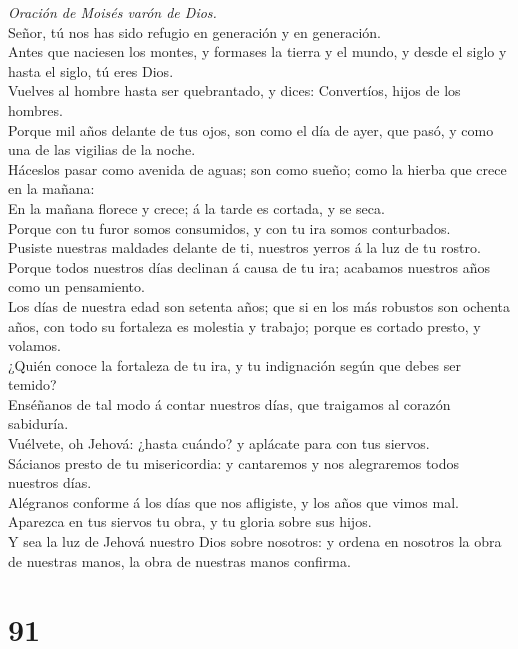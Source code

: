 \emph{Oración de Moisés varón de Dios.}\\
Señor, tú nos has sido refugio en generación y en generación.\\
 Antes que naciesen los montes, y formases la tierra y el
mundo, y desde el siglo y hasta el siglo, tú eres Dios.\\
 Vuelves al hombre hasta ser quebrantado, y dices:
Convertíos, hijos de los hombres.\\
 Porque mil años delante de tus ojos, son como el día de
ayer, que pasó, y como una de las vigilias de la noche.\\
 Háceslos pasar como avenida de aguas; son como sueño; como
la hierba que crece en la mañana:\\
 En la mañana florece y crece; á la tarde es cortada, y se
seca.\\
 Porque con tu furor somos consumidos, y con tu ira somos
conturbados.\\
 Pusiste nuestras maldades delante de ti, nuestros yerros á
la luz de tu rostro.\\
 Porque todos nuestros días declinan á causa de tu ira;
acabamos nuestros años como un pensamiento.\\
 Los días de nuestra edad son setenta años; que si en los
más robustos son ochenta años, con todo su fortaleza es molestia y
trabajo; porque es cortado presto, y volamos.\\
 ¿Quién conoce la fortaleza de tu ira, y tu indignación
según que debes ser temido?\\
 Enséñanos de tal modo á contar nuestros días, que
traigamos al corazón sabiduría.\\
 Vuélvete, oh Jehová: ¿hasta cuándo? y aplácate para con
tus siervos.\\
 Sácianos presto de tu misericordia: y cantaremos y nos
alegraremos todos nuestros días.\\
 Alégranos conforme á los días que nos afligiste, y los
años que vimos mal.\\
 Aparezca en tus siervos tu obra, y tu gloria sobre sus
hijos.\\
 Y sea la luz de Jehová nuestro Dios sobre nosotros: y
ordena en nosotros la obra de nuestras manos, la obra de nuestras manos
confirma.

\hypertarget{section-90}{%
\section{91}\label{section-90}}

